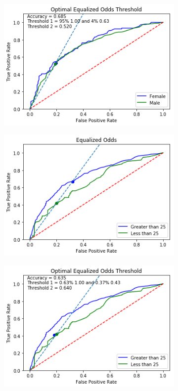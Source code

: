 \documentclass[11pt, fleqn, titlepage]{article}
\begin{document}
\begin{figure}[H]
\begin{subfigure}{0.5\textwidth}
		\end{subfigure}%
		\begin{subfigure}{0.5\textwidth}
			\centering
			\includegraphics[width=0.9\linewidth]{"imgs/Equalized Odds Correctied_sex"}
		\end{subfigure}
		\begin{subfigure}{0.5\textwidth}
			\centering
			\includegraphics[width=0.9\linewidth]{"imgs/Equalized Odds Optimal_age"}
		\end{subfigure}%
		\begin{subfigure}{0.5\textwidth}
			\centering
			\includegraphics[width=0.9\linewidth]{"imgs/Equalized Odds Correctied_age"}

\end{subfigure}
\end{figure}
\end{document}
